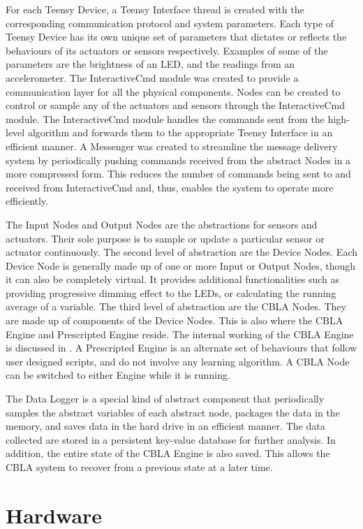 For each Teensy Device, a Teensy Interface thread is created with the corresponding communication protocol and system parameters. Each type of Teensy Device has its own unique set of parameters that dictates or reflects the behaviours of its actuators or sensors respectively. Examples of some of the parameters are the brightness of an LED, and the readings from an accelerometer. The InteractiveCmd module was created to provide a communication layer for all the physical components. Nodes can be created to control or sample any of the actuators and sensors through the InteractiveCmd module. The InteractiveCmd module handles the commands sent from the high-level algorithm and forwards them to the appropriate Teensy Interface in an efficient manner. A Messenger was created to streamline the message delivery system by periodically pushing commands received from the abstract Nodes in a more compressed form. This reduces the number of commands being sent to and received from InteractiveCmd and, thus, enables the system to operate more efficiently.

The Input Nodes and Output Nodes are the abstractions for sensors and actuators. Their sole purpose is to sample or update a particular sensor or actuator continuously. The second level of abstraction are the Device Nodes. Each Device Node is generally made up of one or more Input or Output Nodes, though it can also be completely virtual. It provides additional functionalities such as providing progressive dimming effect to the LEDs, or calculating the running average of a variable. The third level of abstraction are the CBLA Nodes. They are made up of components of the Device Nodes. This is also where the CBLA Engine and Prescripted Engine reside. The internal working of the CBLA Engine is discussed in . A Prescripted Engine is an alternate set of behaviours that follow user designed scripts, and do not involve any learning algorithm. A CBLA Node can be switched to either Engine while it is running. 

The Data Logger is a special kind of abstract component that periodically samples the abstract variables of each abstract node, packages the data in the memory, and saves data in the hard drive in an efficient manner. The data collected are stored in a persistent key-value database for further analysis. In addition, the entire state of the CBLA Engine is also saved. This allows the CBLA system to recover from a previous state at a later time.


\section{Hardware} \label{sec:hardware}


